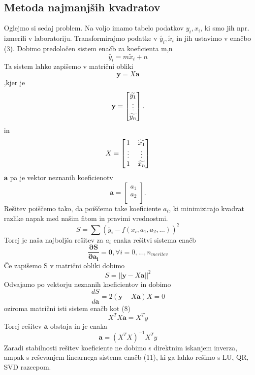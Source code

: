 \documentclass[11pt, a4paper]{article}
\renewcommand{\vec}[1]{\mathbf{#1}}
\begin{document}
\subsection{Metoda najmanjših kvadratov}
Oglejmo si sedaj problem. Na voljo imamo tabelo podatkov $y_i,x_i$, ki smo jih npr. izmerili v laboratoriju. Transformirajmo podatke v $\widetilde{y_i}, \widetilde{x}_i$ in jih ustavimo v enačbo (3). Dobimo predoločen sistem enačb za koeficienta m,n
\begin{equation}
\widetilde{y_i} = m \widetilde{x}_i + n
\end{equation}
Ta sistem lahko zapišemo v matrični obliki
\begin{equation}
\vec{y} = X \vec{a}
\end{equation}
,kjer je 
\[
\vec{y} = 
	\begin{bmatrix}
	\widetilde{y_1}\\
	\vdotswithin{}		\\
	\widetilde{y_n}\\
	\end{bmatrix}.
\]
in 
\[
X=
  \begin{bmatrix}
    1 & \widetilde{x_1} \\
    \vdotswithin{...} & \vdotswithin{...}         \\
    1 &  \widetilde{x_n} \\
  \end{bmatrix}
\]
$\vec{a}$ pa je vektor neznanih koeficienotv
\[
\vec{a} = 
	\begin{bmatrix}
	a_1\\
    a_2 \\
	\end{bmatrix}.
\]
Rešitev poiščemo tako, da poiščemo take koeficiente $a_i$, ki minimizirajo kvadrat razlike napak med našim fitom in pravimi vrednostmi.
\begin{equation}
S = \sum (\widetilde{y_i} - f(x_i, a_1,a_2,...))^2
\end{equation}
Torej je naša najboljša rešitev za $a_i$ enaka rešitvi sistema enačb
\begin{equation}
\pmb{\frac{\partial S} {\partial a_i}  = 0 },
\forall i = 0,...,n_{meritev}
\end{equation}
Če zapišemo S v matrični obliki dobimo 
\begin{equation}
S = ||\vec{y}-X\vec{a}||^2
\end{equation}
Odvajamo po vektorju neznanih koeficientov in dobimo
\begin{equation}
\frac{dS}{d\vec{a}} = 2 (\vec{y} - X\vec{a}) X = 0
\end{equation}
oziroma matrični isti sistem enačb kot (8)
\begin{equation}
X^TX\vec{a} = X^Ty
\end{equation}
Torej rešitev $\vec{a}$ obstaja in je enaka
\begin{equation}
\vec{a} = (X^TX)^{-1} X^Ty
\end{equation}
Zaradi stabilnosti rešitev koeficiente ne dobimo s direktnim iskanjem inverza, ampak s reševanjem linearnega sistema enačb (11), ki ga lahko rešimo s LU, QR, SVD razcepom.
\end{document}
